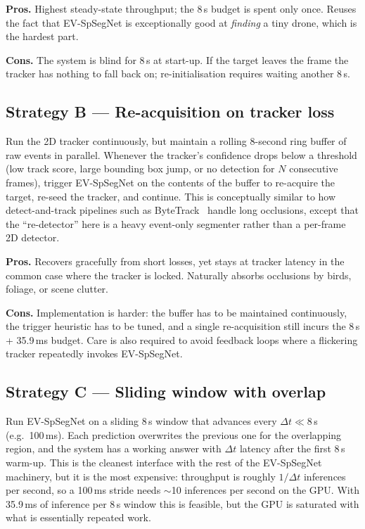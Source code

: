 \documentclass[11pt,a4paper]{article}
\begin{document}
\textbf{Pros.} Highest steady-state throughput; the 8\,s budget is
spent only once. Reuses the fact that EV-SpSegNet is exceptionally
good at \emph{finding} a tiny drone, which is the hardest part.

\textbf{Cons.} The system is blind for 8\,s at start-up. If the
target leaves the frame the tracker has nothing to fall back on;
re-initialisation requires waiting another 8\,s.

\subsection{Strategy B --- Re-acquisition on tracker loss}

Run the 2D tracker continuously, but maintain a rolling 8-second
ring buffer of raw events in parallel. Whenever the tracker's
confidence drops below a threshold (low track score, large bounding
box jump, or no detection for $N$ consecutive frames), trigger
EV-SpSegNet on the contents of the buffer to re-acquire the target,
re-seed the tracker, and continue. This is conceptually similar to
how detect-and-track pipelines such as
ByteTrack~\cite{zhang2022bytetrack} handle long occlusions, except
that the ``re-detector'' here is a heavy event-only segmenter rather
than a per-frame 2D detector.

\textbf{Pros.} Recovers gracefully from short losses, yet stays at
tracker latency in the common case where the tracker is locked.
Naturally absorbs occlusions by birds, foliage, or scene clutter.

\textbf{Cons.} Implementation is harder: the buffer has to be
maintained continuously, the trigger heuristic has to be tuned,
and a single re-acquisition still incurs the 8\,s + 35.9\,ms
budget. Care is also required to avoid feedback loops where a
flickering tracker repeatedly invokes EV-SpSegNet.

\subsection{Strategy C --- Sliding window with overlap}

Run EV-SpSegNet on a sliding 8\,s window that advances every
$\Delta t \ll 8$\,s (e.g.\ 100\,ms). Each prediction overwrites the
previous one for the overlapping region, and the system has a
working answer with $\Delta t$ latency after the first 8\,s
warm-up. This is the cleanest interface with the rest of the
EV-SpSegNet machinery, but it is the most expensive: throughput is
roughly $1/\Delta t$ inferences per second, so a 100\,ms stride
needs \mbox{$\sim$10} inferences per second on the GPU. With 35.9\,ms
of inference per 8\,s window this is feasible, but the GPU is
saturated with what is essentially repeated work.
\end{document}

